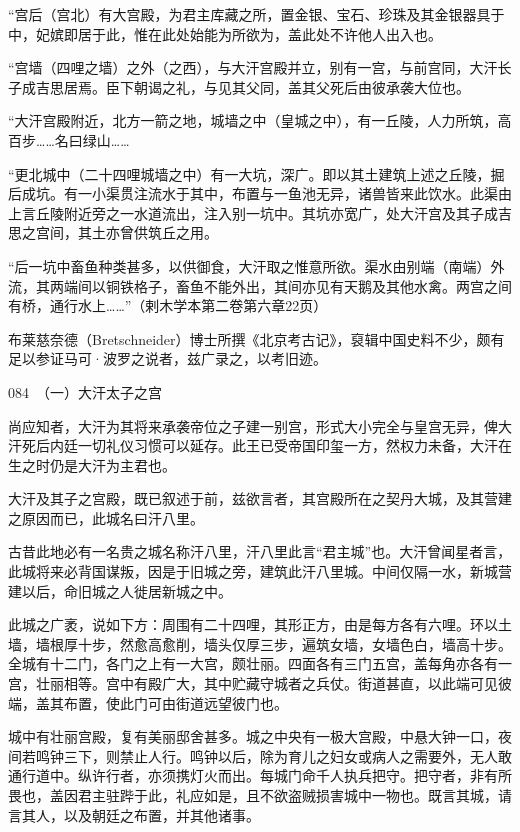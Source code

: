 \documentclass[12pt,UTF8]{ctexbook}
\begin{document}
“宫后（宫北）有大宫殿，为君主库藏之所，置金银、宝石、珍珠及其金银器具于中，妃嫔即居于此，惟在此处始能为所欲为，盖此处不许他人出入也。

“宫墙（四哩之墙）之外（之西），与大汗宫殿并立，别有一宫，与前宫同，大汗长子成吉思居焉。臣下朝谒之礼，与见其父同，盖其父死后由彼承袭大位也。

“大汗宫殿附近，北方一箭之地，城墙之中（皇城之中），有一丘陵，人力所筑，高百步……名曰绿山……

“更北城中（二十四哩城墙之中）有一大坑，深广。即以其土建筑上述之丘陵，掘后成坑。有一小渠贯注流水于其中，布置与一鱼池无异，诸兽皆来此饮水。此渠由上言丘陵附近旁之一水道流出，注入别一坑中。其坑亦宽广，处大汗宫及其子成吉思之宫间，其土亦曾供筑丘之用。

“后一坑中畜鱼种类甚多，以供御食，大汗取之惟意所欲。渠水由别端（南端）外流，其两端间以铜铁格子，畜鱼不能外出，其间亦见有天鹅及其他水禽。两宫之间有桥，通行水上……”（剌木学本第二卷第六章22页）

布莱慈奈德（Bretschneider）博士所撰《北京考古记》，裒辑中国史料不少，颇有足以参证马可·波罗之说者，兹广录之，以考旧迹。





084　（一）大汗太子之宫

尚应知者，大汗为其将来承袭帝位之子建一别宫，形式大小完全与皇宫无异，俾大汗死后内廷一切礼仪习惯可以延存。此王已受帝国印玺一方，然权力未备，大汗在生之时仍是大汗为主君也。

大汗及其子之宫殿，既已叙述于前，兹欲言者，其宫殿所在之契丹大城，及其营建之原因而已，此城名曰汗八里。

古昔此地必有一名贵之城名称汗八里，汗八里此言“君主城”也。大汗曾闻星者言，此城将来必背国谋叛，因是于旧城之旁，建筑此汗八里城。中间仅隔一水，新城营建以后，命旧城之人徙居新城之中。

此城之广袤，说如下方：周围有二十四哩，其形正方，由是每方各有六哩。环以土墙，墙根厚十步，然愈高愈削，墙头仅厚三步，遍筑女墙，女墙色白，墙高十步。全城有十二门，各门之上有一大宫，颇壮丽。四面各有三门五宫，盖每角亦各有一宫，壮丽相等。宫中有殿广大，其中贮藏守城者之兵仗。街道甚直，以此端可见彼端，盖其布置，使此门可由街道远望彼门也。

城中有壮丽宫殿，复有美丽邸舍甚多。城之中央有一极大宫殿，中悬大钟一口，夜间若鸣钟三下，则禁止人行。鸣钟以后，除为育儿之妇女或病人之需要外，无人敢通行道中。纵许行者，亦须携灯火而出。每城门命千人执兵把守。把守者，非有所畏也，盖因君主驻跸于此，礼应如是，且不欲盗贼损害城中一物也。既言其城，请言其人，以及朝廷之布置，并其他诸事。
\end{document}
